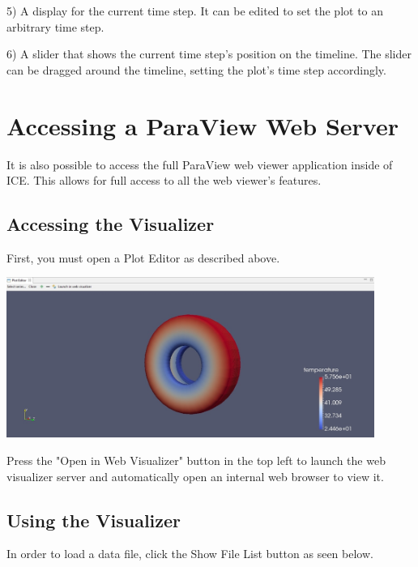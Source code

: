 5) A display for the current time step. It can be edited to set the plot to an
arbitrary time step. 

6) A slider that shows the current time step's position on the timeline. The
slider can be dragged around the timeline, setting the plot's time step
accordingly.

\section{Accessing a ParaView Web Server}

It is also possible to access the full ParaView web viewer application inside of
ICE. This allows for full access to all the web viewer's features.

\subsection{Accessing the Visualizer}

First, you must open a Plot Editor as described above.

\begin{center}
\includegraphics[width=12cm]{images/ParaViewPlotEditor}
\end{center}

Press the "Open in Web Visualizer" button in the top left to launch the web visualizer server and automatically open an internal web browser to view it.

\subsection{Using the Visualizer}

In order to load a data file, click the Show File List button as seen below.


